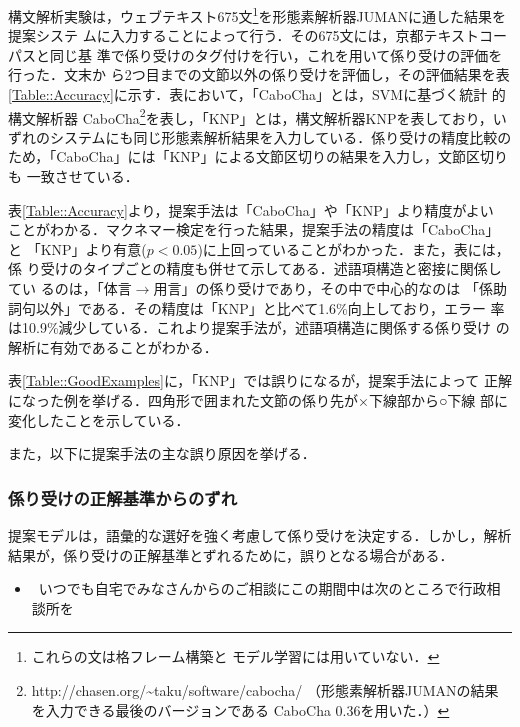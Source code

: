 \documentclass[japanese]{jnlp_1.3e}
\begin{document}
構文解析実験は，ウェブテキスト675文\footnote{これらの文は格フレーム構築と
モデル学習には用いていない．}を形態素解析器JUMANに通した結果を提案システ
ムに入力することによって行う．その675文には，京都テキストコーパスと同じ基
準で係り受けのタグ付けを行い，これを用いて係り受けの評価を行った．文末か
ら2つ目までの文節以外の係り受けを評価し，その評価結果を表
\ref{Table::Accuracy}に示す．表において，「CaboCha」とは，SVMに基づく統計
的構文解析器
    CaboCha\footnote{http://chasen.org/{\textasciitilde}taku/software/cabocha/ 
（形態素解析器JUMANの結果を入力できる最後のバージョンである
CaboCha 0.36を用いた．）}を表し，「KNP」とは，構文解析器KNPを表しており，い
ずれのシステムにも同じ形態素解析結果を入力している．係り受けの精度比較の
ため，「CaboCha」には「KNP」による文節区切りの結果を入力し，文節区切りも
一致させている．

\begin{table}[b]

\end{table}

\begin{table}[b]

\end{table}

表\ref{Table::Accuracy}より，提案手法は「CaboCha」や「KNP」より精度がよい
ことがわかる．マクネマー検定を行った結果，提案手法の精度は「CaboCha」と
「KNP」より有意($p < 0.05$)に上回っていることがわかった．また，表には，係
り受けのタイプごとの精度も併せて示してある．述語項構造と密接に関係してい
るのは，「体言$\rightarrow$用言」の係り受けであり，その中で中心的なのは
「係助詞句以外」である．その精度は「KNP」と比べて1.6\%向上しており，エラー
率は10.9\%減少している．これより提案手法が，述語項構造に関係する係り受け
の解析に有効であることがわかる．

表\ref{Table::GoodExamples}に，「KNP」では誤りになるが，提案手法によって
正解になった例を挙げる．四角形で囲まれた文節の係り先が×下線部から○下線
部に変化したことを示している．

また，以下に提案手法の主な誤り原因を挙げる．


\subsubsection*{係り受けの正解基準からのずれ}

提案モデルは，語彙的な選好を強く考慮して係り受けを決定する．しかし，解析
結果が，係り受けの正解基準とずれるために，誤りとなる場合がある．

\begin{itemize}
 \item {}~いつでも自宅でみなさんからのご相談にこの期間中は次のところで行政相談所を
\end{itemize}
\end{document}
